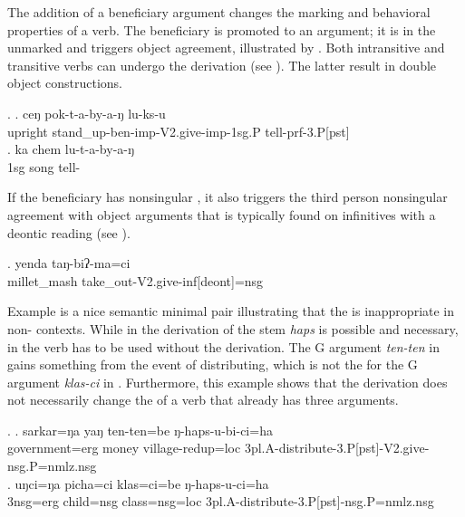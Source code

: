 The addition of  a beneficiary argument changes the marking and behavioral properties of a verb. The beneficiary is promoted to an argument; it is in the unmarked   and triggers object agreement, illustrated by \Next. Both intransitive and transitive verbs can undergo the  derivation (see \Next). The latter result in double object constructions.  

 \ex. \ag. ceŋ    pok-t-a-by-a-ŋ lu-ks-u\\
upright stand\_up-{\sc ben-imp-V2.give-imp-1sg.P} tell{\sc -prf-3.P[pst]}\\
 
 \bg. ka chem lu-t-a-by-a-ŋ\\
 {\sc 1sg} song tell-\\
 
 If the beneficiary has nonsingular , it also triggers the third person nonsingular agreement with object arguments that is typically found  on infinitives with a deontic reading (see ).

\exg. yenda taŋ-biʔ-ma=ci\\
millet\_mash take\_out-{\sc V2.give-inf[deont]=nsg}\\
 
 
Example \Next is a nice semantic minimal pair illustrating that the  is inappropriate in non- contexts. While in \Next[a] the  derivation of the stem \emph{haps}  is possible and necessary, in \Next[b] the verb has to be used without the  derivation. The G argument  \emph{ten-ten}   in \Next[a] gains something from the event of distributing, which is not the  for the G argument \emph{klas-ci}  in \Next[b]. Furthermore, this example shows that the  derivation does not necessarily change the  of a verb that already has three arguments.

 \ex. \ag. sarkar=ŋa yaŋ ten-ten=be ŋ-haps-u-bi-ci=ha\\
government{\sc =erg} money village{\sc -redup=loc}	{\sc 3pl.A-}distribute-{\sc 3.P[pst]-V2.give-nsg.P=nmlz.nsg}\\
 \bg. uŋci=ŋa picha=ci klas=ci=be ŋ-haps-u-ci=ha\\
{\sc 3nsg=erg} child{\sc =nsg} class{\sc =nsg=loc}	{\sc 3pl.A-}distribute-{\sc 3.P[pst]-nsg.P=nmlz.nsg}\\


